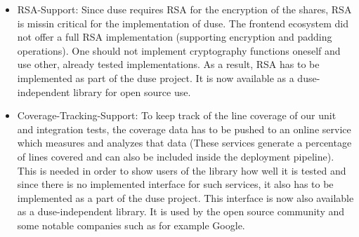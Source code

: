 \begin{itemize}
  \item RSA-Support: Since duse requires RSA for the encryption of the shares,
  RSA is missin critical for the implementation of duse. The frontend ecosystem
  did not offer a full RSA implementation (supporting encryption and padding
  operations). One should not implement cryptography functions oneself and use
  other, already tested implementations. As a result, RSA has to be implemented
  as part of the duse project. It is now available as a duse-independent library
  for open source use.

  \item Coverage-Tracking-Support: To keep track of the line coverage of our unit and
  integration tests, the coverage data has to be pushed to an online service
  which measures and analyzes that data (These services generate a percentage of
  lines covered and can also be included inside the deployment pipeline). This is
  needed in order to show users of the library how well it is tested and since
  there is no implemented interface for such services, it also has to be implemented
  as a part of the duse project. This interface is now also available as a
  duse-independent library. It is used by the open source community and some notable
  companies such as for example Google.


\end{itemize}
